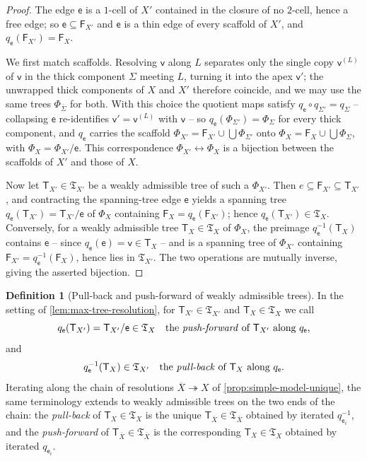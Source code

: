 \documentclass[reqno]{amsart}
\theoremstyle{definition}
\newtheorem{definition}[theorem]{Definition}
\newcommand\frT{\mathfrak{T}}
\newcommand\sfF{\mathsf{F}}
\newcommand\sfT{\mathsf{T}}
\newcommand\sfe{\mathsf{e}}
\newcommand\sfv{\mathsf{v}}
\renewcommand{\bar}{\overline}
\numberwithin{equation}{section}
\begin{document}
\begin{proof}
The edge \(\sfe\) is a \(1\)-cell of \(X'\) contained in the closure
of no \(2\)-cell, hence a free edge; so \(\sfe\subseteq\sfF_{X'}\)
and \(\sfe\) is a thin edge of every scaffold of \(X'\), and
\(q_\sfe(\sfF_{X'})=\sfF_X\).

We first match scaffolds. Resolving \(\sfv\) along \(L\) separates
only the single copy \(\sfv^{(L)}\) of \(\sfv\) in the thick component
\(\Sigma\) meeting \(L\), turning it into the apex \(\sfv'\); the
unwrapped thick components of \(X\) and \(X'\) therefore coincide,
and we may use the same trees \(\Phi_{\bar{\Sigma}}\) for
both. With this choice the quotient maps satisfy
\(q_\sfe\circ q_{\Sigma'}=q_\Sigma\) -- collapsing \(\sfe\) re-identifies
\(\sfv'=\sfv^{(L)}\) with \(\sfv\) -- so
\(q_\sfe(\Phi_{\Sigma'})=\Phi_\Sigma\) for every thick component, and
\(q_\sfe\) carries the scaffold
\(\Phi_{X'}=\sfF_{X'}\cup\bigcup\Phi_{\Sigma'}\) onto
\(\Phi_X=\sfF_X\cup\bigcup\Phi_\Sigma\), with
\(\Phi_X=\Phi_{X'}/\sfe\). This correspondence
\(\Phi_{X'}\leftrightarrow\Phi_X\) is a bijection between the scaffolds of \(X'\) and those of \(X\).

Now let \(\sfT_{X'}\in\frT_{X'}\) be a weakly admissible tree of such
a \(\Phi_{X'}\). Then \(e\subseteq\sfF_{X'}\subseteq \sfT_{X'}\),
and contracting the spanning-tree edge \(\sfe\) yields a spanning tree
\(q_\sfe(\sfT_{X'})=\sfT_{X'}/\sfe\) of \(\Phi_X\) containing
\(\sfF_X=q_\sfe(\sfF_{X'})\); hence
\(q_\sfe(\sfT_{X'})\in\frT_X\). Conversely, for a weakly admissible
tree \(\sfT_X\in\frT_X\) of \(\Phi_X\), the preimage
\(q_\sfe^{-1}(\sfT_X)\) contains \(\sfe\) -- since \(q_\sfe(\sfe)=\sfv\in \sfT_X\) -- and
is a spanning tree of \(\Phi_{X'}\) containing
\(\sfF_{X'}=q_\sfe^{-1}(\sfF_X)\), hence lies in
\(\frT_{X'}\). The two operations are mutually inverse,
giving the asserted bijection.
\end{proof}

\begin{definition}[Pull-back and push-forward of weakly admissible
trees]\label{def:tree-pullback-pushforward}
In the setting of \cref{lem:max-tree-resolution}, for
\(\sfT_{X'}\in\frT_{X'}\) and \(\sfT_X\in\frT_X\) we call
\[
q_\sfe(\sfT_{X'}) = \sfT_{X'}/\sfe \in\frT_X
\quad\text{the \emph{push-forward} of \(\sfT_{X'}\) along \(q_\sfe\),}
\]
and
\[
q_\sfe^{-1}(\sfT_X) \in\frT_{X'}
\quad\text{the \emph{pull-back} of \(\sfT_X\) along \(q_\sfe\).}
\]
Iterating along the chain of resolutions
\(\bar X\twoheadrightarrow X\) of
\cref{prop:simple-model-unique}, the same terminology
extends to weakly admissible trees on the two ends of the chain: the
\emph{pull-back} of \(\sfT_X\in\frT_X\) is the unique
\(\sfT_{\bar X}\in\frT_{\bar X}\) obtained by iterated
\(q_{\sfe_i}^{-1}\), and the \emph{push-forward} of
\(\sfT_{\bar X}\in\frT_{\bar X}\) is the corresponding
\(\sfT_X\in\frT_X\) obtained by iterated \(q_{\sfe_i}\).
\end{definition}
\end{document}
